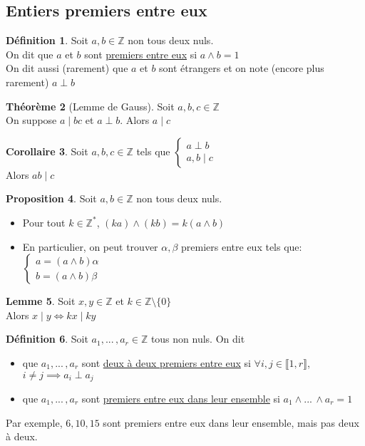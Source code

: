\documentclass[10pt,a4paper]{article}
\theoremstyle{definition}
\newtheorem{proposition}{Proposition}[section]
\newtheorem{theorem}[proposition]{Théorème}
\newtheorem{corollaire}[proposition]{Corollaire}
\newtheorem{lemme}[proposition]{Lemme}
\newtheorem{definition}[proposition]{Définition}
\begin{document}
\subsection{Entiers premiers entre eux}
\begin{definition}
Soit $a, b \in \mathbb{Z}$ non tous deux nuls. \\
On dit que $a$ et $b$ sont \uline{premiers entre eux} si $a \wedge b = 1$ \\
On dit aussi (rarement) que $a$ et $b$ sont étrangers et on note (encore plus rarement) $a \perp b$
\end{definition}
\begin{theorem}[Lemme de Gauss]
Soit $a, b, c \in \mathbb{Z}$ \\
On suppose $a \mid bc$ et $a \perp b$. Alors $a \mid c$
\end{theorem}
\begin{corollaire}
Soit $a, b, c \in \mathbb{Z}$ tels que $\begin{cases}
a \perp b \\
a, b \mid c
\end{cases}$ \\
Alors $ab \mid c$
\end{corollaire}
\begin{proposition}
Soit $a, b \in \mathbb{Z}$ non tous deux nuls.
\begin{itemize}
\item Pour tout $k \in \mathbb{Z}^*$, $(ka) \wedge (kb) = k(a \wedge b)$
\item En particulier, on peut trouver $\alpha, \beta$ premiers entre eux tels que: \\
$\begin{cases}
a = (a \wedge b) \alpha \\
b = (a \wedge b) \beta
\end{cases}$
\end{itemize}
\end{proposition}
\begin{lemme}
Soit $x, y \in \mathbb{Z}$ et $k \in \mathbb{Z} \setminus \{ 0 \}$ \\
Alors $x \mid y \iff kx \mid ky$
\end{lemme}
\begin{definition}
Soit $a_1, ...\,, a_r \in \mathbb{Z}$ tous non nuls. On dit
\begin{itemize}
\item que $a_1, ...\,, a_r$ sont \uline{deux à deux premiers entre eux} si $\forall i, j \in \llbracket 1, r \rrbracket$, $i \neq j \implies a_i \perp a_j$
\item que $a_1, ...\,, a_r$ sont \uline{premiers entre eux dans leur ensemble} si $a_1 \wedge ...\, \wedge a_r = 1$
\end{itemize}
Par exemple, $6, 10, 15$ sont premiers entre eux dans leur ensemble, mais pas deux à deux.
\end{definition}
\end{document}
